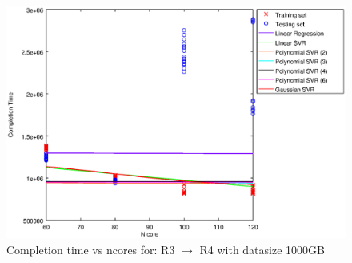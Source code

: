 
\begin {figure}[hbtp]
\centering
\includegraphics[width=\textwidth]{output/R3_R4_1000_ALL_FEATURES/plot_R3_R4_1000.eps}
\caption{Completion time vs ncores for: R3 $\rightarrow$ R4 with datasize 1000GB}
\label{fig:coreonly_linear_R3_R4_1000}
\end {figure}
